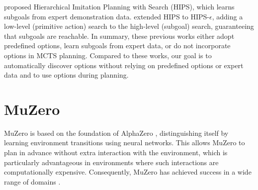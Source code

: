 \citet{kujanpaa_hierarchical_2023} proposed Hierarchical Imitation Planning with Search (HIPS), which learns subgoals from expert demonstration data.
\citet{kujanpaa_hybrid_2024} extended HIPS to HIPS-$\epsilon$, adding a low-level (primitive action) search to the high-level (subgoal) search, guaranteeing that subgoals are reachable.
In summary, these previous works either adopt predefined options, learn subgoals from expert data, or do not incorporate options in MCTS planning.
Compared to these works, our goal is to automatically discover options without relying on predefined options or expert data and to use options during planning.


\section{MuZero}
MuZero \cite{schrittwieser_mastering_2020} is based on the foundation of AlphaZero \cite{silver_general_2018}, distinguishing itself by learning environment transitions using neural networks.
This allows MuZero to plan in advance without extra interaction with the environment, which is particularly advantageous in environments where such interactions are computationally expensive.
Consequently, MuZero has achieved success in a wide range of domains \cite{schrittwieser_mastering_2020,danihelka_policy_2022,antonoglou_planning_2021,hubert_learning_2021,mandhane_muzero_2022,wang_optimizing_2023}.

